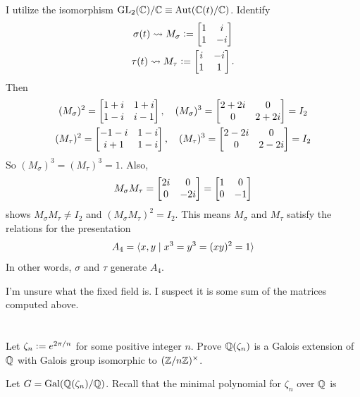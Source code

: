 \documentclass[12pt]{article}
\begin{document}
I utilize the isomorphism $\GL{2}{\C} / \C \equiv \text{Aut}(\C(t) / \C)$. 
Identify 
\begin{gather*}
  \sigma(t) \rightsquigarrow M_\sigma \vcentcolon= \begin{bmatrix}1 & i \\ 1 & -i\end{bmatrix} \\ 
  \tau(t) \rightsquigarrow M_\tau \vcentcolon= \begin{bmatrix}i & -i \\ 1 & 1\end{bmatrix}. 
\end{gather*}
Then 
\begin{gather*}
  (M_\sigma)^{2} = \begin{bmatrix}1 + i & 1 + i \\ 1 - i & i - 1\end{bmatrix}, \quad (M_\sigma)^{3} = \begin{bmatrix}2 + 2i & 0 \\ 0 & 2 + 2i\end{bmatrix} = I_2 \\ 
  (M_\tau)^{2} = \begin{bmatrix}-1 - i & 1 - i \\ i + 1 & 1 - i\end{bmatrix}, \quad (M_\tau)^{3} = \begin{bmatrix}2 -2i & 0 \\ 0 & 2 - 2i\end{bmatrix} = I_2
\end{gather*}
So $(M_\sigma)^{3} = (M_\tau)^{3} = 1$. 
Also, 
$$M_\sigma M_\tau = \begin{bmatrix}2i & 0 \\ 0 & -2i\end{bmatrix} = \begin{bmatrix}1 & 0 \\ 0 & -1\end{bmatrix}$$
shows $M_\sigma M_\tau \neq I_2$ and $(M_\sigma M_\tau)^{2} = I_2$. 
This means $M_\sigma$ and $M_\tau$ satisfy the relations for the presentation 
$$A_4 = \langle x, y \mid x^3 = y^3 = (xy)^2 = 1\rangle$$
In other words, $\sigma$ and $\tau$ generate $A_4$. 

I'm unsure what the fixed field is. 
I suspect it is some sum of the matrices computed above. 

\section{} 
Let $\zeta_n \vcentcolon= e^{2\pi / n}$ for some positive integer $n$. 
Prove $\mathbb{Q}(\zeta_n)$ is a Galois extension of $\mathbb{Q}$ with Galois group isomorphic to $(\mathbb{Z} / n\mathbb{Z})^{\times}$. 

\noindent \dotfill

Let $G = \text{Gal}(\mathbb{Q}(\zeta_n) / \mathbb{Q})$. 
Recall that the minimal polynomial for $\zeta_n$ over $\mathbb{Q}$ is 
\end{document}
